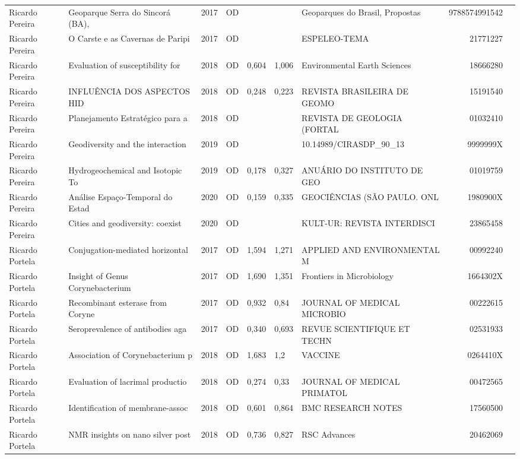 \documentclass[12pt,brazil]{article}\usepackage[]{graphicx}\usepackage[]{xcolor}
\begin{document}
\begin{longtable}{lllrrllrr}
Ricardo Pereira & Geoparque Serra do Sincorá (BA), & 2017 & OD &  &  & Geoparques do Brasil, Propostas & 9788574991542 \\
Ricardo Pereira & O Carste e as Cavernas de Paripi & 2017 & OD &  &  & ESPELEO-TEMA & 21771227 \\
Ricardo Pereira & Evaluation of susceptibility for & 2018 & OD & 0,604 & 1,006 & Environmental Earth Sciences & 18666280 \\
Ricardo Pereira & INFLUÊNCIA DOS ASPECTOS HID & 2018 & OD & 0,248 & 0,223 & REVISTA BRASILEIRA DE GEOMO & 15191540 \\
Ricardo Pereira & Planejamento Estratégico para a  & 2018 & OD &  &  & REVISTA DE GEOLOGIA (FORTAL & 01032410 \\
Ricardo Pereira & Geodiversity and the interaction & 2019 & OD &  &  & 10.14989/CIRASDP\_90\_13 & 9999999X \\
Ricardo Pereira & Hydrogeochemical and Isotopic To & 2019 & OD & 0,178 & 0,327 & ANUÁRIO DO INSTITUTO DE GEO & 01019759 \\
Ricardo Pereira & Análise Espaço-Temporal do Estad & 2020 & OD & 0,159 & 0,335 & GEOCIÊNCIAS (SÃO PAULO. ONL & 1980900X \\
Ricardo Pereira & Cities and geodiversity: coexist & 2020 & OD &  &  & KULT-UR: REVISTA INTERDISCI & 23865458 \\
Ricardo Portela & Conjugation-mediated horizontal  & 2017 & OD & 1,594 & 1,271 & APPLIED AND ENVIRONMENTAL M & 00992240 \\
Ricardo Portela & Insight of Genus Corynebacterium & 2017 & OD & 1,690 & 1,351 & Frontiers in Microbiology & 1664302X \\
Ricardo Portela & Recombinant esterase from Coryne & 2017 & OD & 0,932 & 0,84 & JOURNAL OF MEDICAL MICROBIO & 00222615 \\
Ricardo Portela & Seroprevalence of antibodies aga & 2017 & OD & 0,340 & 0,693 & REVUE SCIENTIFIQUE ET TECHN & 02531933 \\
Ricardo Portela & Association of Corynebacterium p & 2018 & OD & 1,683 & 1,2 & VACCINE & 0264410X \\
Ricardo Portela & Evaluation of lacrimal productio & 2018 & OD & 0,274 & 0,33 & JOURNAL OF MEDICAL PRIMATOL & 00472565 \\
Ricardo Portela & Identification of membrane-assoc & 2018 & OD & 0,601 & 0,864 & BMC RESEARCH NOTES & 17560500 \\
Ricardo Portela & NMR insights on nano silver post & 2018 & OD & 0,736 & 0,827 & RSC Advances & 20462069 \\

\end{longtable}
\end{document}
